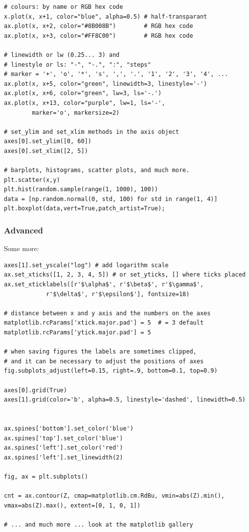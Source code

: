 \documentclass[11pt]{article}
\begin{document}
\begin{lstlisting}
# colours: by name or RGB hex code
x.plot(x, x+1, color="blue", alpha=0.5) # half-transparant
ax.plot(x, x+2, color="#8B008B")        # RGB hex code
ax.plot(x, x+3, color="#FF8C00")        # RGB hex code 

# linewidth or lw (0.25... 3) and 
# linestyle or ls: "-", "-.", ":", "steps"
# marker = '+', 'o', '*', 's', ',', '.', '1', '2', '3', '4', ...
ax.plot(x, x+5, color="green", linewidth=3, linestyle='-')
ax.plot(x, x+6, color="green", lw=3, ls='-.')
ax.plot(x, x+13, color="purple", lw=1, ls='-', 
        marker='o', markersize=2)

# set_ylim and set_xlim methods in the axis object
axes[0].set_ylim([0, 60])
axes[0].set_xlim([2, 5])

# barplots, histograms, scatter plots, and much more.
plt.scatter(x,y)
plt.hist(random.sample(range(1, 1000), 100))
data = [np.random.normal(0, std, 100) for std in range(1, 4)]
plt.boxplot(data,vert=True,patch_artist=True); 
\end{lstlisting}

\subsubsection{Advanced}
Some more:
\begin{lstlisting}
axes[1].set_yscale("log") # add logarithm scale
ax.set_xticks([1, 2, 3, 4, 5]) # or set_yticks, [] where ticks placed
ax.set_xticklabels([r'$\alpha$', r'$\beta$', r'$\gamma$', 
            r'$\delta$', r'$\epsilon$'], fontsize=18)

# distance between x and y axis and the numbers on the axes
matplotlib.rcParams['xtick.major.pad'] = 5  # = 3 default
matplotlib.rcParams['ytick.major.pad'] = 5

# when saving figures the labels are sometimes clipped, 
# and it can be necessary to adjust the positions of axes
fig.subplots_adjust(left=0.15, right=.9, bottom=0.1, top=0.9)

axes[0].grid(True)
axes[1].grid(color='b', alpha=0.5, linestyle='dashed', linewidth=0.5)


ax.spines['bottom'].set_color('blue')
ax.spines['top'].set_color('blue')
ax.spines['left'].set_color('red')
ax.spines['left'].set_linewidth(2)

fig, ax = plt.subplots()

cnt = ax.contour(Z, cmap=matplotlib.cm.RdBu, vmin=abs(Z).min(), vmax=abs(Z).max(), extent=[0, 1, 0, 1])

# ... and much more ... look at the matplotlib gallery
\end{lstlisting}
\end{document}
